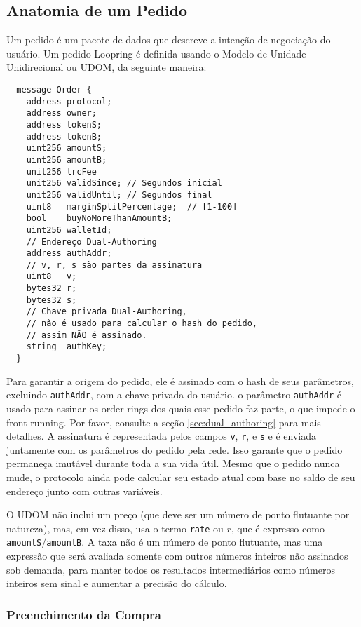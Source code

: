 \documentclass[UTF8,nofonts]{article}
\begin{document}
\begin{multicols}{2}
\subsection{Anatomia de um Pedido\label{anatomy}}
Um pedido é um pacote de dados que descreve a intenção de negociação do usuário. Um pedido Loopring é definida usando o Modelo de Unidade Unidirecional ou UDOM, da seguinte maneira:

\begin{verbatim}
  message Order {
    address protocol;
    address owner;
    address tokenS;
    address tokenB;
    uint256 amountS;
    uint256 amountB;
    unit256 lrcFee
    unit256 validSince; // Segundos inicial
    unit256 validUntil; // Segundos final
    uint8   marginSplitPercentage;  // [1-100]
    bool    buyNoMoreThanAmountB;
    uint256 walletId;
    // Endereço Dual-Authoring 
    address authAddr;
   	// v, r, s são partes da assinatura
    uint8   v;       
    bytes32 r;
    bytes32 s;
    // Chave privada Dual-Authoring,
    // não é usado para calcular o hash do pedido,
    // assim NÃO é assinado.
    string  authKey;          
  }
\end{verbatim}


Para garantir a origem do pedido, ele é assinado com o hash de seus parâmetros, excluindo \verb|authAddr|, com a chave privada do usuário. o parâmetro \verb|authAddr| é usado para assinar os order-rings dos quais esse pedido faz parte, o que impede o front-running. Por favor, consulte a seção \ref{sec:dual_authoring} para mais detalhes. A assinatura é representada pelos campos \verb|v|, \verb|r|, e \verb|s| e é enviada juntamente com os parâmetros do pedido pela rede. Isso garante que o pedido permaneça imutável durante toda a sua vida útil. Mesmo que o pedido nunca mude, o protocolo ainda pode calcular seu estado atual com base no saldo de seu endereço junto com outras variáveis.



O UDOM não inclui um preço (que deve ser um número de ponto flutuante por natureza), mas, em vez disso, usa o termo \verb|rate| ou $r$, que é expresso como \verb|amountS|/\verb|amountB|. A taxa não é um número de ponto flutuante, mas uma expressão que será avaliada somente com outros números inteiros não assinados sob demanda, para manter todos os resultados intermediários como números inteiros sem sinal e aumentar a precisão do cálculo.

\subsubsection{Preenchimento da Compra }



\end{multicols}
\end{document}
